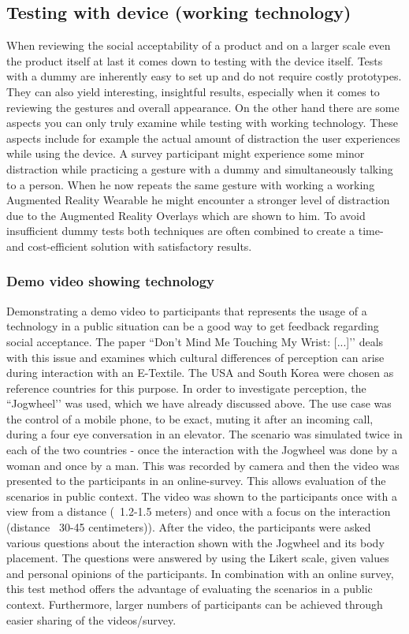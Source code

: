 \documentclass{sigchi}
\begin{document}
\subsection{Testing with device (working technology)}
When reviewing the social acceptability of a product and on a larger scale even the product itself at last it comes down to testing with the device itself. Tests with a dummy are inherently easy to set up and do not require costly prototypes. They can also yield interesting, insightful results, especially when it comes to reviewing the gestures and overall appearance. On the other hand there are some aspects you can only truly examine while testing with working technology. These aspects include for example the actual amount of distraction the user experiences while using the device. A survey participant might experience some minor distraction while practicing a gesture with a dummy and simultaneously talking to a person. When he now repeats the same gesture with working a working Augmented Reality Wearable he might encounter a stronger level of distraction due to the Augmented Reality Overlays which are shown to him.
To avoid insufficient dummy tests both techniques are often combined to create a time- and cost-efficient solution with satisfactory results.

\subsubsection{Demo video showing technology}
Demonstrating a demo video to participants that represents the usage of a technology in a public situation can be a good way to get feedback regarding social acceptance. The paper ``Don't Mind Me Touching My Wrist: [...]’’\cite{touch-wrist} deals with this issue and examines which cultural differences of perception can arise during interaction with an E-Textile. \cite{touch-wrist} The USA and South Korea were chosen as reference countries for this purpose. In order to investigate perception, the ``Jogwheel’’ was used, which we have already discussed above. The use case was the control of a mobile phone, to be exact, muting it after an incoming call, during a four eye conversation in an elevator. The scenario was simulated twice in each of the two countries - once the interaction with the Jogwheel was done by a woman and once by a man. This was recorded by camera and then the video was presented to the participants in an online-survey. This allows evaluation of the scenarios in public context. The video was shown to the participants once with a view from a distance (~1.2-1.5 meters) and once with a focus on the interaction (distance ~30-45 centimeters)). After the video, the participants were asked various questions about the interaction shown with the Jogwheel and its body placement. The questions were answered by using the Likert scale, given values and personal opinions of the participants. \cite{touch-wrist} In combination with an online survey, this test method offers the advantage of evaluating the scenarios in a public context. Furthermore, larger numbers of participants can be achieved through easier sharing of the videos/survey. \cite{touch-wrist}
\end{document}
